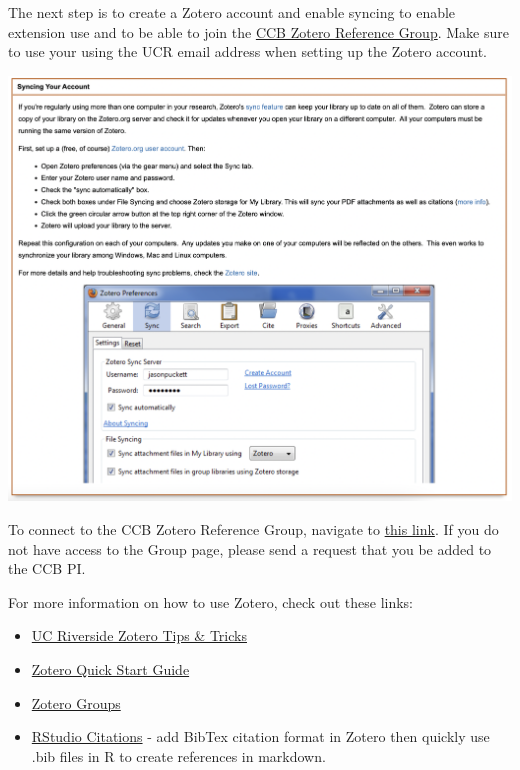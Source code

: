 \documentclass[
]{book}
\providecommand{\tightlist}{%
  \setlength{\itemsep}{0pt}\setlength{\parskip}{0pt}}
\begin{document}
The next step is to create a Zotero account and enable syncing to enable extension use and to be able to join the \href{https://www.zotero.org/groups/4734848/ccbucr}{CCB Zotero Reference Group}. Make sure to use your using the UCR email address when setting up the Zotero account.

\begin{center}\includegraphics[width=22.14in]{images/zoterosyncing} \end{center}

To connect to the CCB Zotero Reference Group, navigate to \href{https://www.zotero.org/groups/4734848/ccbucr}{this link}. If you do not have access to the Group page, please send a request that you be added to the CCB PI.

For more information on how to use Zotero, check out these links:

\begin{itemize}
\tightlist
\item
  \href{https://guides.lib.ucr.edu/c.php?g=171064\&p=1126842}{UC Riverside Zotero Tips \& Tricks}
\item
  \href{https://www.zotero.org/support/quick_start_guide}{Zotero Quick Start Guide}
\item
  \href{https://www.zotero.org/support/groups}{Zotero Groups}
\item
  \href{https://www.youtube.com/watch?v=zuuOYjE8m98}{RStudio Citations} - add BibTex citation format in Zotero then quickly use .bib files in R to create references in markdown.
\end{itemize}
\end{document}
